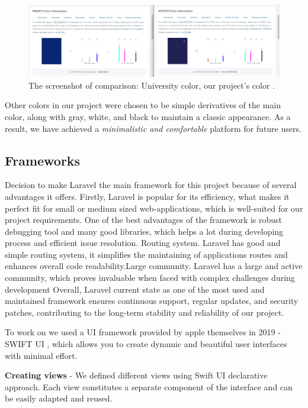 \begin{figure}[ht]\label{fig:colors}
  \centering
  \includegraphics[width=0.8\linewidth]{figures/color comparison.jpg}
  \caption{The screenshot of comparison: University color, our project's color .}
\end{figure}
\newpage
Other colors in our project were chosen to be simple derivatives of the main color, along with gray, white, and black to maintain a classic appearance. As a result, we have achieved a \textit{minimalistic and comfortable} platform for future users.

\subsection{Frameworks}\label{frmw}
\hspace*{1cm} Decision to make Laravel \cite{laravel} the main framework for this project because of several advantages it offers. Firstly, Laravel \cite{laravel} is popular for its efficiency, what makes it perfect fit for small or medium sized web-applications, which is well-suited for our project requirements. One of the best advantages of the framework is robust debugging tool and many good libraries, which helps a lot during developing process and efficient issue resolution.
Routing system. Laravel \cite{laravel} has good and simple routing system, it simplifies the maintaining of applications routes and enhances overall code readability.Large community. Laravel \cite{laravel} has a large and active community, which proves invaluable when faced with complex challenges during development
Overall, Laravel \cite{laravel} current state as one of the most used and maintained framework ensures continuous support, regular updates, and security patches, contributing to the long-term stability and reliability of our project.
\par

\hrulefill 

To work on   we used a UI framework provided by apple themselves in 2019 - SWIFT UI \cite{swift}, which allows you to create dynamic and beautiful user interfaces with minimal effort. 

\textbf{Creating views} - We defined different views using Swift UI \cite{swift} declarative approach. Each view constitutes a separate component of the interface and can be easily adapted and reused.


